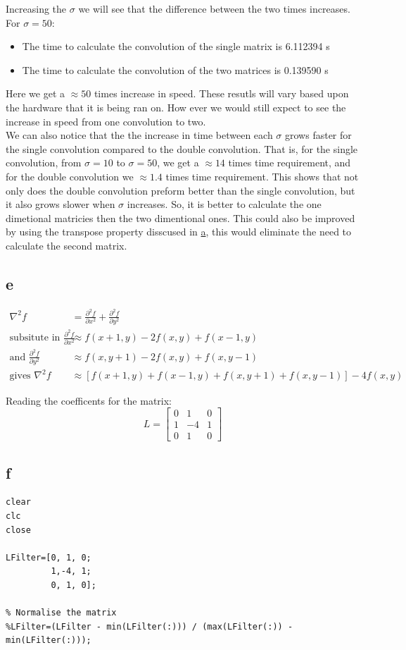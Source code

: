 \documentclass[11pt]{article}
\begin{document}
Increasing the \(\sigma\) we will see that the difference between the two times increases. For \(\sigma=50\):
\begin{itemize}
\item The time to calculate the convolution of the single matrix is 6.112394 s
\item The time to calculate the convolution of the two matrices is 0.139590 s
\end{itemize}
Here we get a \(\approx 50\) times increase in speed. These resutls will vary based upon the hardware that it is being ran on. How ever we would still expect to see the increase in speed from one convolution to two.\\
We can also notice that the the increase in time between each \(\sigma\) grows faster for the single convolution compared to the double convolution. That is, for the single convolution, from \(\sigma=10\) to \(\sigma=50\), we get a \(\approx 14\) times time requirement, and for the double convolution we \(\approx 1.4\) times time requirement. This shows that not only does the double convolution preform better than the single convolution, but it also grows slower when \(\sigma\) increases. So, it is better to calculate the one dimetional matricies then the two dimentional ones. This could also be improved by using the transpose property disscused in \hyperref[sec:org63987d5]{a}, this would eliminate the need to calculate the second matrix.
\subsection{e}
\label{sec:org7969db1}
\begin{align*}
\nabla^{2}f &= \frac{\partial^2 f}{\partial x^2}+ \frac{\partial^2 f}{\partial y^2} \\
\textrm{subsitute in } \frac{\partial^2 f}{\partial x^2} &\approx f(x+1,y)-2f(x,y)+f(x-1,y) \\
\textrm{and } \frac{\partial^2 f}{\partial y^2} &\approx f(x,y+1)-2f(x,y)+f(x,y-1) \\
\textrm{gives }\nabla^{2}f & \approx \left[ f(x+1,y) + f(x-1,y) + f(x,y+1) + f(x,y-1)\right] - 4f(x,y)
\end{align*}

Reading the coefficents for the matrix:
\[L=\begin{bmatrix}
0 & 1  & 0 \\
1 & -4 & 1 \\
0 & 1  & 0
\end{bmatrix}\]
\subsection{f}
\label{sec:orga753811}
\begin{verbatim}
clear
clc
close

LFilter=[0, 1, 0;
         1,-4, 1;
         0, 1, 0];

% Normalise the matrix
%LFilter=(LFilter - min(LFilter(:))) / (max(LFilter(:)) - min(LFilter(:)));
\end{verbatim}
\end{document}

